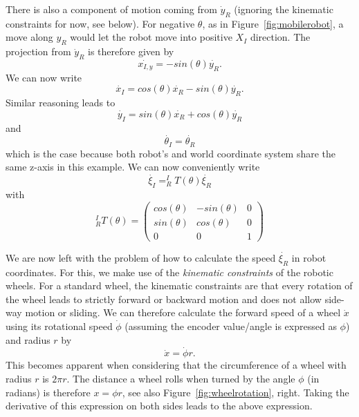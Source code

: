 There is also a component of motion coming from $ \dot{y}_R$ (ignoring the kinematic constraints for now, see below).  For negative $ \theta$, as in Figure~\ref{fig:mobilerobot}, a move along $y_R$ would let the robot move into positive $ X_I$ direction. The projection from $ \dot{y}_R$ is therefore given by
\begin{equation}
\dot{x_{I,y}}=-sin(\theta)\dot{y_R}.
\end{equation}
We can now write
\begin{equation}
\dot{x_I}=cos(\theta) \dot{x_R} - sin(\theta) \dot{y_R}.
\end{equation}
Similar reasoning leads to
\begin{equation}
\dot{y_I}=sin(\theta) \dot{x_R} + cos(\theta) \dot{y_R}
\end{equation}
and
\begin{equation}
\dot{\theta_I}=\dot{\theta_R}
\end{equation}
which is the case because both robot's and world coordinate system share the same z-axis in this example. We can now conveniently write
\begin{equation}
\dot{\xi_I}=^I_RT(\theta)\dot{\xi_R}
\end{equation}
with
\begin{equation}
^I_RT(\theta)=\left(\begin{array}{ccc}
cos(\theta) & -sin(\theta) & 0 \\
sin(\theta) & cos(\theta) & 0 \\
0 & 0 & 1\end{array}\right)
\end{equation}

We are now left with the problem of how to calculate the speed $ \dot{\xi_R}$ in robot coordinates. For this, we make use of the \emph{kinematic constraints} of the robotic wheels. For a standard wheel, the kinematic constraints are that every rotation of the wheel leads to strictly forward or backward motion and does not allow side-way motion or sliding. We can therefore calculate the forward speed of a wheel $ \dot{x}$ using its rotational speed $ \dot{\phi}$ (assuming the encoder value/angle is expressed as $ \phi$) and radius $ r$ by
\begin{equation}
\dot{x}=\dot{\phi}r.
\end{equation}
This becomes apparent when considering that the circumference of a wheel with radius $r$ is $2\pi r$. The distance a wheel rolls when turned by the angle $ \phi$ (in radians) is therefore $ x=\phi r$, see also Figure~\ref{fig:wheelrotation}, right. Taking the derivative of this expression on both sides leads to the above expression.

